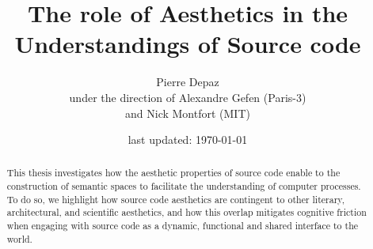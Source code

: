 \documentclass{report}
\begin{document}
\title{The role of Aesthetics in the Understandings of Source code}
\author{Pierre Depaz\\under the direction of Alexandre Gefen (Paris-3)\\and Nick Montfort (MIT)}
\date{last updated: \today}
\maketitle

\begin{abstract}
    This thesis investigates how the aesthetic properties of source code enable to the construction of semantic spaces to facilitate the understanding of computer processes. To do so, we highlight how source code aesthetics are contingent to other literary, architectural, and scientific aesthetics, and how this overlap mitigates cognitive friction when engaging with source code as a dynamic, functional and shared interface to the world.
\end{abstract}




\pagebreak



\pagebreak



\pagebreak



\pagebreak



\pagebreak






\end{document}
